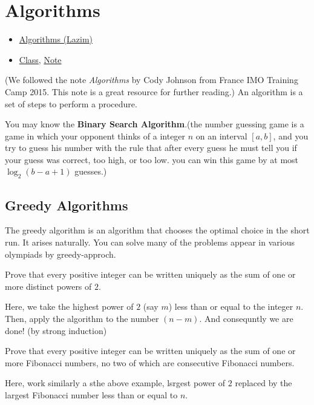 \chapter{Algorithms}%

\begin{linkb}
   \begin{itemize}
        \item \href{https://www.youtube.com/watch?v=VjXhzp-hYoE}{Algorithms (Lazim)} 
        \item \href{https://drive.google.com/file/d/1p0i6hqSbMrBuEjdoiQCPlfXQlBMAtMJ3/view}{Class}, \href{https://drive.google.com/file/d/1KeTtY-0IxhPWDcDFvvau15P9_OEyCuq_/view}{Note}
   \end{itemize}
\end{linkb}

(We followed the note \textit{Algorithms} by Cody Johnson from France IMO Training Camp 2015. This note is a great resource for further reading.)
An algorithm is a set of steps to perform a procedure.

You may know the \textbf{Binary Search Algorithm}.(the number guessing game is a game
in which your opponent thinks of a integer $n$ on an interval $[a, b]$, and you try to guess his number with the
rule that after every guess he must tell you if your guess was correct, too high, or too low. you can win this game by at most $\log_2(b-a+1)$ guesses.)

\section{Greedy Algorithms}
The greedy algorithm is an algorithm that chooses the optimal choice in the short run.
It arises naturally. 
You can solve many of the problems appear in various olympiads by greedy-approch.


\begin{example}
Prove that every positive integer can be written uniquely as
the sum of one or more distinct powers of $2$.
\end{example}
Here, we take the highest power of $2$ (say $m$) less than or equal to the integer $n$. Then, apply the algorithm to the number $(n-m)$.
And consequntly we are done! (by strong induction)


\begin{example}
Prove that every positive integer can be written uniquely as
the sum of one or more Fibonacci numbers, no two of which are consecutive Fibonacci numbers.
\end{example}
Here, work similarly a sthe above example, lsrgest power of $2$ replaced by the largest Fibonacci number less than or equal to $n$.


